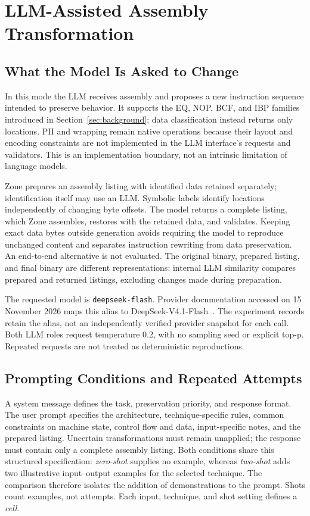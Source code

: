 \section{LLM-Assisted Assembly Transformation}\label{sec:llm}
\subsection{What the Model Is Asked to Change}
In this mode the LLM receives assembly and proposes a new instruction
sequence intended to preserve behavior. It supports the EQ, NOP, BCF,
and IBP families introduced in Section~\ref{sec:background}; data
classification instead returns only locations. PII and wrapping remain
native operations because their layout and encoding constraints are not
implemented in the LLM interface's requests and validators. This is an
implementation boundary, not an intrinsic limitation of language models.

Zone prepares an assembly listing with identified data retained separately;
identification itself may use an LLM. Symbolic labels identify locations
independently of changing byte offsets. The model returns a complete listing,
which Zone assembles, restores with the retained data, and validates.
Keeping exact data bytes outside generation avoids requiring the model to
reproduce unchanged content and separates instruction rewriting from data
preservation. An end-to-end alternative is not evaluated. The original binary, prepared listing, and final
binary are different representations: internal LLM similarity compares
prepared and returned listings, excluding changes made during preparation.

The requested model is \texttt{deepseek-flash}. Provider documentation
accessed on 15 November 2026 maps this alias to DeepSeek-V4.1-Flash~\cite{deepseek_models}.
The experiment records retain the alias, not an independently verified
provider snapshot for each call.
Both LLM roles request temperature 0.2, with no sampling seed or explicit
top-p. Repeated requests are not treated as deterministic reproductions.

\subsection{Prompting Conditions and Repeated Attempts}
A system message defines the task, preservation priority, and response
format. The user prompt specifies the architecture, technique-specific
rules, common constraints on machine state, control flow and data,
input-specific notes, and the prepared listing. Uncertain transformations
must remain unapplied; the response must contain only a complete assembly
listing. Both conditions share this structured specification:
\emph{zero-shot} supplies no example, whereas \emph{two-shot} adds two
illustrative input--output examples for the selected technique. The comparison
therefore isolates the addition of demonstrations to the prompt. Shots count
examples, not attempts. Each input, technique, and shot setting defines a
\emph{cell}.

